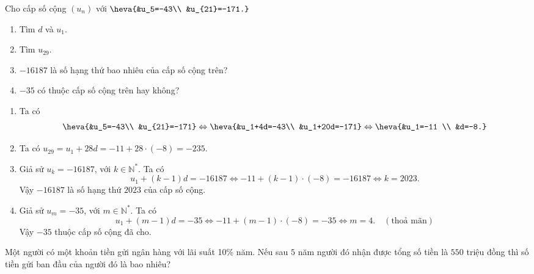 \begin{vd}%
	Cho cấp số cộng $(u_n)$ với $\heva{&u_5=-43\\ &u_{21}=-171.}$
	\begin{enumerate}
		\item Tìm $d$ và $u_1$.
		\item Tìm $u_{29}$.
		\item $-16187$ là số hạng thứ bao nhiêu của cấp số cộng trên?
		\item $-35$ có thuộc cấp số cộng trên hay không?		
	\end{enumerate}
	\loigiai
	{
		\begin{enumerate}
			\item Ta có
			\begin{eqnarray*}
				\heva{&u_5=-43\\ &u_{21}=-171} \Leftrightarrow \heva{&u_1+4d=-43\\ &u_1+20d=-171} \Leftrightarrow \heva{&u_1=-11 \\ &d=-8.}
			\end{eqnarray*}
			\item Ta có $u_{29}= u_1+28d= -11+28 \cdot (-8)= -235$.
			\item Giả sử $u_k= -16187$, với $k \in \mathbb{N}^*$. Ta có
			\[
			u_1+ (k-1)d= -16187 \Leftrightarrow -11 + (k-1) \cdot (-8)= -16187 \Leftrightarrow k= 2023.
			\]
			Vậy $-16187$ là số hạng thứ $2023$ của cấp số cộng.
			\item Giả sử $u_m= -35$, với $m\in \mathbb{N}^*$. Ta có
			\[
			u_1+ (m-1) d= -35 \Leftrightarrow -11+ (m-1) \cdot (-8)= -35 \Leftrightarrow m=4. \quad (\text{thoả mãn})
			\]
			Vậy $-35$ thuộc cấp số cộng đã cho.
		\end{enumerate}
	}
\end{vd}

\begin{vd}%
	Một người có một khoản tiền gửi ngân hàng với lãi suất 10\% năm. Nếu sau $ 5 $ năm người đó nhận được tổng số tiền là $ 550 $ triệu đồng thì số tiền gửi ban đầu của người đó là bao nhiêu?
\end{vd}

